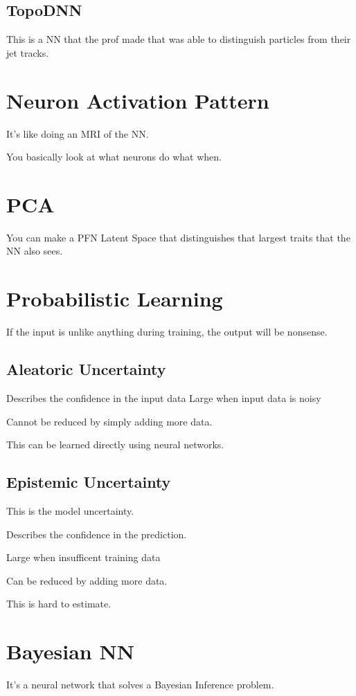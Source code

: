 \documentclass[fleqn]{report}
\begin{document}
\subsection{TopoDNN}
This is a NN that the prof made that was able to distinguish particles from 
their jet tracks. 

\section{Neuron Activation Pattern}
It's like doing an MRI of the NN. 

You basically look at what neurons do what when. 

\section{PCA}
You can make a PFN Latent Space that distinguishes that largest traits 
that the NN also sees. 

\section{Probabilistic Learning}
If the input is unlike anything during training, the output will be nonsense. 

\subsection{Aleatoric Uncertainty }

Describes the confidence in the input data
Large when input data is noisy 

Cannot be reduced by simply adding more data.

This can be learned directly using neural networks. 

\subsection{Epistemic Uncertainty }
This is the model uncertainty. 

Describes the confidence in the prediction. 

Large when insufficent training data 

Can be reduced by adding more data. 

This is hard to estimate. 

\section{Bayesian NN}
It's a neural network that solves a Bayesian Inference problem.
\end{document}
